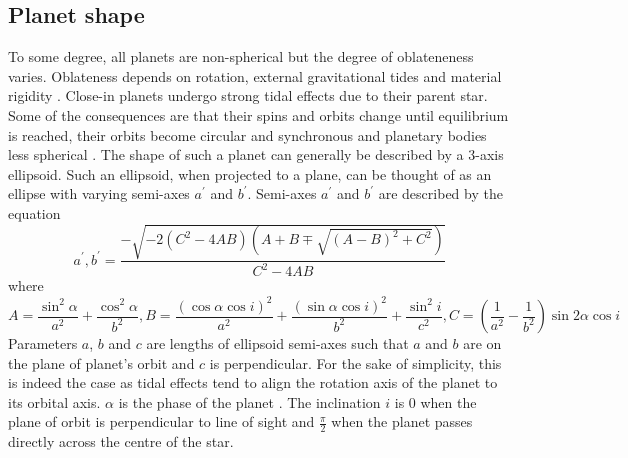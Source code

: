 \documentclass[10pt]{article}
\numberwithin{equation}{subsection}
\begin{document}
\subsection{Planet shape}
To some degree, all planets are non-spherical but the degree of oblateneness varies.
Oblateness depends on rotation, external gravitational tides and material rigidity \cite{carter}.
Close-in planets undergo strong tidal effects due to their parent star. Some of the 
consequences are that their spins and orbits change until equilibrium is reached, their
orbits become circular and synchronous and planetary bodies less spherical \cite{correia1}.
The shape of such a planet can generally be described by a 3-axis ellipsoid.
Such an ellipsoid, when projected to a plane, can be thought of as an ellipse with varying
semi-axes $a^{\prime}$ and $b^{\prime}$. Semi-axes $a^{\prime}$ and $b^{\prime}$ 
are described by the equation \cite{correia1, walterova}
\begin{equation}
  a^{\prime}, b^{\prime} = \frac{-\sqrt{-2(C^2 - 4AB)\left(A + B \mp\sqrt{(A -B)^2 + C^2}\right)}}{C^2 - 4AB}
  \label{eq:semi-axes}
\end{equation}
where 
\begin{equation}
  A = \frac{\sin^2\alpha}{a^2}+\frac{\cos^2\alpha}{b^2}, B = \frac{(\cos\alpha\cos i)^2}{a^2} + \frac{(\sin\alpha\cos i)^2}{b^2} + \frac{\sin^2 i}{c^2}, C = \left(\frac{1}{a^2} - \frac{1}{b^2}\right)\sin 2\alpha\cos i
  \label{eq:ABC}
\end{equation}
Parameters $a$, $b$ and $c$ are lengths of ellipsoid semi-axes such that $a$ and $b$
are on the plane of planet's orbit and $c$ is perpendicular. For the sake of simplicity,
this is indeed the case as tidal effects tend to align the rotation axis of the planet to
its orbital axis.
$\alpha$ is the phase of the planet . The inclination $i$ is 0 when the plane of orbit is perpendicular to line of sight
and $\frac{\pi}{2}$ when the planet passes directly across the centre of the star.
\end{document}
